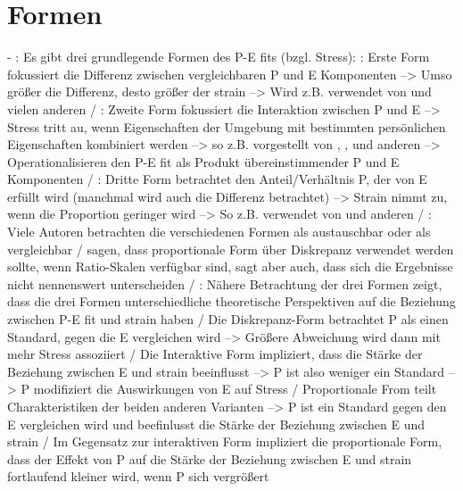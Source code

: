 \section{Formen}
\label{ch:personEnvironmentFit:formen}
- \cite[S. 5]{edwards:1990}: Es gibt drei grundlegende Formen des P-E fits (bzgl. Stress): \cite[S. 5]{edwards:1990}: Erste Form fokussiert die Differenz zwischen vergleichbaren P und E Komponenten --> Umso größer die Differenz, desto größer der strain --> Wird z.B. verwendet von \textcite{mechanismsOfJobStressAndStrain:1982} und vielen anderen / \cite[S. 5]{edwards:1990}: Zweite Form fokussiert die Interaktion zwischen P und E --> Stress tritt au, wenn Eigenschaften der Umgebung mit bestimmten persönlichen Eigenschaften kombiniert werden --> so z.B. vorgestellt von \textcite{cherringtonEngland:1980}, \textcite{lyons:1971}, \textcite{obrien:1980} und anderen --> Operationalisieren den P-E fit als Produkt übereinstimmender P und E Komponenten / \cite[S. 5]{edwards:1990}: Dritte Form betrachtet den Anteil/Verhältnis P, der von E erfüllt wird (manchmal wird auch die Differenz betrachtet) --> Strain nimmt zu, wenn die Proportion geringer wird --> So z.B. verwendet von \textcite{mechanismsOfJobStressAndStrain:1982} und anderen / \cite[S. 5]{edwards:1990}: Viele Autoren betrachten die verschiedenen Formen als austauschbar oder als vergleichbar /  \textcite{mechanismsOfJobStressAndStrain:1982} sagen, dass proportionale Form über Diskrepanz verwendet werden sollte, wenn Ratio-Skalen verfügbar sind, sagt aber auch, dass sich die Ergebnisse nicht nennenswert unterscheiden / \cite[S. 5]{edwards:1990}: Nähere Betrachtung der drei Formen zeigt, dass die drei Formen unterschiedliche theoretische Perspektiven auf die Beziehung zwischen P-E fit und strain haben / Die Diskrepanz-Form betrachtet P als einen Standard, gegen die E vergleichen wird --> Größere Abweichung wird dann mit mehr Stress assoziiert / Die Interaktive Form impliziert, dass die Stärke der Beziehung zwischen E und strain beeinflusst --> P ist also weniger ein Standard --> P modifiziert die Auswirkungen von E auf Stress / Proportionale From teilt Charakteristiken der beiden anderen Varianten --> P ist ein Standard gegen den E vergleichen wird und beefinlusst die Stärke der Beziehung zwischen E und strain / Im Gegensatz zur interaktiven Form impliziert die proportionale Form, dass der Effekt von P auf die Stärke der Beziehung zwischen E und strain fortlaufend kleiner wird, wenn P sich vergrößert \\
